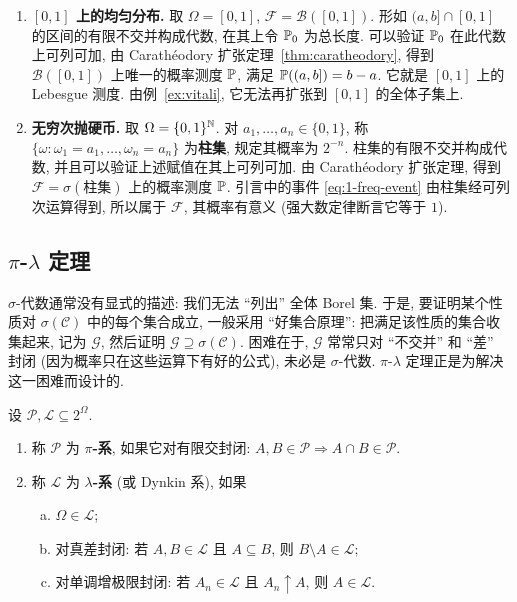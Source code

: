 \begin{example}\label{ex:basic-spaces}
\begin{enumerate}
\item \textbf{$[0,1]$ 上的均匀分布.} 取 $\Omega=[0,1]$, $\mathcal{F}=\mathcal{B}([0,1])$. 形如 $(a,b]\cap[0,1]$ 的区间的有限不交并构成代数, 在其上令 $\P_0$ 为总长度. 可以验证 $\P_0$ 在此代数上可列可加, 由 Carath\'eodory 扩张定理~\ref{thm:caratheodory}, 得到 $\mathcal{B}([0,1])$ 上唯一的概率测度 $\P$, 满足 $\P((a,b])=b-a$. 它就是 $[0,1]$ 上的 Lebesgue 测度. 由例~\ref{ex:vitali}, 它无法再扩张到 $[0,1]$ 的全体子集上.
\item \textbf{无穷次抛硬币.} 取 $\Omega=\{0,1\}^{\N}$. 对 $a_1,\dots,a_n\in\{0,1\}$, 称 $\{\omega:\omega_1=a_1,\dots,\omega_n=a_n\}$ 为\textbf{柱集}, 规定其概率为 $2^{-n}$. 柱集的有限不交并构成代数, 并且可以验证上述赋值在其上可列可加. 由 Carath\'eodory 扩张定理, 得到 $\mathcal{F}=\sigma(\text{柱集})$ 上的概率测度 $\P$. 引言中的事件 \eqref{eq:1-freq-event} 由柱集经可列次运算得到, 所以属于 $\mathcal{F}$, 其概率有意义 (强大数定律断言它等于 $1$).
\end{enumerate}
\end{example}

\subsection{\texorpdfstring{$\pi$-$\lambda$}{pi-lambda} 定理}

$\sigma$-代数通常没有显式的描述: 我们无法 ``列出'' 全体 Borel 集. 于是, 要证明某个性质对 $\sigma(\mathcal{C})$ 中的每个集合成立, 一般采用 ``好集合原理'': 把满足该性质的集合收集起来, 记为 $\mathcal{G}$, 然后证明 $\mathcal{G}\supseteq\sigma(\mathcal{C})$. 困难在于, $\mathcal{G}$ 常常只对 ``不交并'' 和 ``差'' 封闭 (因为概率只在这些运算下有好的公式), 未必是 $\sigma$-代数. $\pi$-$\lambda$ 定理正是为解决这一困难而设计的.

\begin{definition}[$\pi$-系与 $\lambda$-系]\label{def:pi-lambda}
设 $\mathcal{P},\mathcal{L}\subseteq2^\Omega$.
\begin{enumerate}
\item 称 $\mathcal{P}$ 为 \textbf{$\pi$-系}, 如果它对有限交封闭: $A,B\in\mathcal{P}\Rightarrow A\cap B\in\mathcal{P}$.
\item 称 $\mathcal{L}$ 为 \textbf{$\lambda$-系} (或 Dynkin 系), 如果
  \begin{enumerate}[(a)]
  \item $\Omega\in\mathcal{L}$;
  \item 对真差封闭: 若 $A,B\in\mathcal{L}$ 且 $A\subseteq B$, 则 $B\setminus A\in\mathcal{L}$;
  \item 对单调增极限封闭: 若 $A_n\in\mathcal{L}$ 且 $A_n\uparrow A$, 则 $A\in\mathcal{L}$.
  \end{enumerate}
\end{enumerate}
\end{definition}

